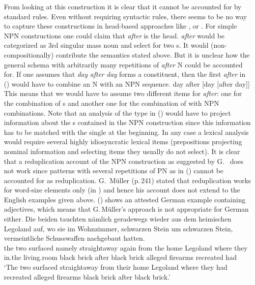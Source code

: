 \documentclass[output=paper]{langsci/langscibook}
\begin{document}

From looking at this construction it is clear that it cannot be accounted for by standard \xbar
rules. Even without requiring \xbar syntactic rules, there seems to be no way to capture these
constructions in head-based approaches like \minimalism, \cg or \dg. For simple NPN constructions
one could claim that \emph{after} is the head. \emph{after} would be categorized as 3rd singular
mass noun and select for two \nbar{}s. It would (non-compositionally) contribute the semantics stated above. But it is unclear how the general schema with arbitrarily
many repetitions of \emph{after} N could be accounted for. If one assumes that \emph{day after day}
forms a constituent, then the first \emph{after} in () would have to combine an N with an NPN sequence.
\ea
day after [day [after day]]
\z
This means that we would have to assume two different items for \emph{after}: one for the
combination of \nbar{}s and another one for the combination of \nbar with NPN combinations. Note
that an analysis of the type in () would have to project information about the \nbar{}s contained
in the NPN construction since this information has to be matched with the single \nbar at the
beginning. In any case a lexical analysis would require several highly idiosyncratic lexical items
(prepositions projecting nominal information and selecting items they usually do not select).
It is clear that a reduplication account of the NPN construction as suggested by
G.\ \citet{GMueller2011a} does not work since patterns with several repetitions of PN as in
() cannot be accounted for as reduplication. G.\ Müller (p.\,241) stated that reduplication works
for word-size elements only (in ) and hence his account does not extend to the English
examples given above. () shows an attested German example containing adjectives, which means
that G.\,Müller's approach is not appropriate for German either.
\ea
\label{ex-schwarzen-stein}
\gll Die beiden tauchten nämlich geradewegs wieder aus dem heimischen Legoland auf, wo sie im
Wohnzimmer, schwarzen Stein um schwarzen Stein, vermeintliche Schusswaffen nachgebaut
hatten.\footnotemark\\
     the two    surfaced namely straightaway again   from the home Legoland \particle{} where they
     in.the living.room black brick after black brick alleged firearms recreated had\\%
{}
\glt `The two surfaced straightaway from their home Legoland where they had recreated alleged
firearms black brick after black brick.'
\z
\end{document}
